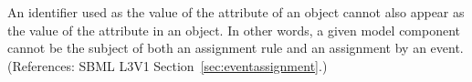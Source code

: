 An identifier used as the value of the attribute  of an
\EventAssignment object cannot also appear as the value of the
 attribute in an \AssignmentRule object.  In other words, a
given model component cannot be the subject of both an assignment rule and
an assignment by an event.  (References: SBML L3V1
Section~\ref{sec:eventassignment}.)
